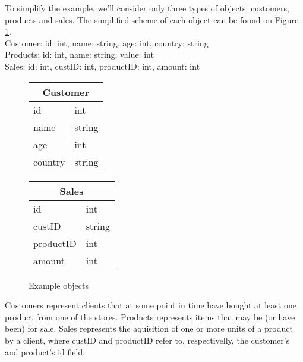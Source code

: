 \documentclass{vldb}
\begin{document}
To simplify the example, we'll consider only three types of objects: customers, products and sales.
The simplified scheme of each object can be found on Figure \ref{fig:objects}.\\

Customer: id: int, name: string, age: int, country: string \\
Products: id: int, name: string, value: int \\
Sales: id: int, custID: int, productID: int, amount: int \\

\begin{figure}
	\label{fig:objects}
	\begin{tabular}{|l|l|}
		\multicolumn{2}{c}{Customer} \\ \hline
		id            & int          \\ \hline
		name          & string       \\ \hline
		age           & int          \\ \hline
		country       & string      \\
		\hline
	\end{tabular}
	\begin{tabular}{|l|l|}
		\multicolumn{2}{c}{Sales} \\ \hline
		id            & int       \\ \hline
		custID        & string    \\ \hline
		productID     & int       \\ \hline
		amount        & int	\\
		\hline      
	\end{tabular}
	\caption{Example objects}
\end{figure}

Customers represent clients that at some point in time have bought at least one product from one of the stores.
Products represents items that may be (or have been) for sale.
Sales represents the aquisition of one or more units of a product by a client, where custID and productID refer to, respectivelly, the customer's and product's id field.
\end{document}
